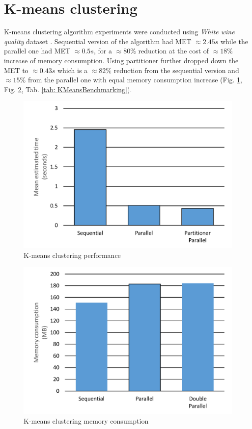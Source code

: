 \clearpage
\section{K-means clustering}
\label{sec: K-means}
K-means clustering algorithm experiments were conducted using \emph{White 
wine quality} dataset \cite{WhiteWine}. Sequential version of the algorithm 
had MET $\approx 2.45s$ while the parallel one had MET $\approx 0.5s$, for a $
\approx 80\%$ reduction at the cost of $\approx 18\%$ increase of memory 
consumption. Using partitioner further dropped down the MET to $\approx 0.43s$
 which is a $\approx 82\%$ reduction from the sequential version and $\approx 
15\%$ from the parallel one with equal memory consumption increase (Fig. \ref{fig: KMeansPerformance}, Fig. \ref{fig: KMeansMemory}, Tab. \ref{tab: 
KMeansBenchmarking}).

\begin{figure}[htb]
\centering
\includegraphics[width=.8\linewidth]{figures04/KMeans.pdf}
\caption{K-means clustering  performance}
\label{fig: KMeansPerformance}
\end{figure}

\begin{figure}[htb]
\centering
\includegraphics[width=.8\linewidth]{figures04/KMeansMemory.pdf}
\caption{K-means clustering memory consumption}
\label{fig: KMeansMemory}
\end{figure}

